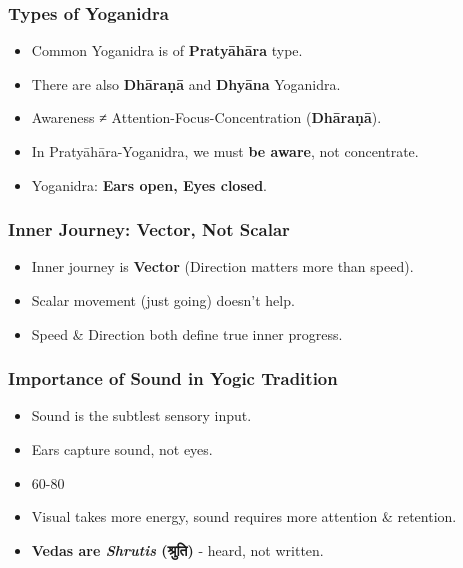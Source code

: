\begin{frame}[fragile]\frametitle{Types of Yoganidra}
      \begin{itemize}
      \item Common Yoganidra is of \textbf{Pratyāhāra} type.
      \item There are also \textbf{Dhāraṇā} and \textbf{Dhyāna} Yoganidra.
      \item Awareness ≠ Attention-Focus-Concentration (\textbf{Dhāraṇā}).
      \item In Pratyāhāra-Yoganidra, we must \textbf{be aware}, not concentrate.
      \item Yoganidra: \textbf{Ears open, Eyes closed}.
      \end{itemize}
\end{frame}

\begin{frame}[fragile]\frametitle{Inner Journey: Vector, Not Scalar}
      \begin{itemize}
      \item Inner journey is \textbf{Vector} (Direction matters more than speed).
      \item Scalar movement (just going) doesn't help.
      \item Speed \& Direction both define true inner progress.
      \end{itemize}
\end{frame}

\begin{frame}[fragile]\frametitle{Importance of Sound in Yogic Tradition}
      \begin{itemize}
      \item Sound is the subtlest sensory input.
      \item Ears capture sound, not eyes.
      \item 60-80%
      \item Visual takes more energy, sound requires more attention \& retention.
      \item \textbf{Vedas are \textit{Shrutis} (श्रुति)} - heard, not written.
      \end{itemize}
\end{frame}

